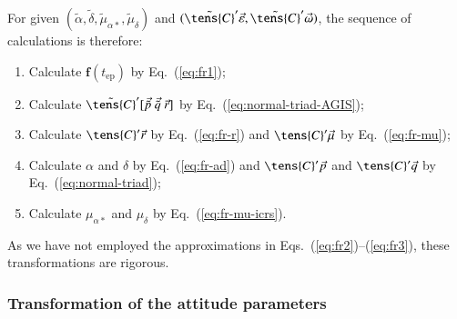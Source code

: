 \documentclass[structabstract]{aa}
\newcommand{\quat}[1]{\mathbf{#1}}
\begin{document}
For given $(\tilde{\alpha}, \tilde{\delta}, \tilde{\mu}_{\alpha*}, \tilde{\mu}_{\delta})$ 
and $(\tilde{\tens{C}}'\vec{\varepsilon},\tilde{\tens{C}}'\vec{\omega})$, the 
sequence of calculations is therefore: 
\begin{enumerate}
\item Calculate $\quat{f}(t_\text{ep})$ by Eq.~(\ref{eq:fr1});
\item Calculate $\tilde{\tens{C}}'[\vec{\tilde{p}}~\vec{\tilde{q}}~\vec{r}]$
by Eq.~(\ref{eq:normal-triad-AGIS});
\item Calculate $\tens{C}'\vec{r}$ by Eq.~(\ref{eq:fr-r}) and $\tens{C}'\vec{\mu}$ 
by Eq.~(\ref{eq:fr-mu}); 
\item Calculate $\alpha$ and $\delta$ by Eq.~(\ref{eq:fr-ad}) and
$\tens{C}'\vec{p}$ and $\tens{C}'\vec{q}$ by Eq.~(\ref{eq:normal-triad}); 
\item Calculate $\mu_{\alpha*}$ and $\mu_{\delta}$ by Eq.~(\ref{eq:fr-mu-icrs}).
\end{enumerate}
As we have not employed the approximations in Eqs.~(\ref{eq:fr2})--(\ref{eq:fr3}),
these transformations are rigorous.


\subsubsection{Transformation of the attitude parameters}\label{sec:frameatt}
\end{document}
